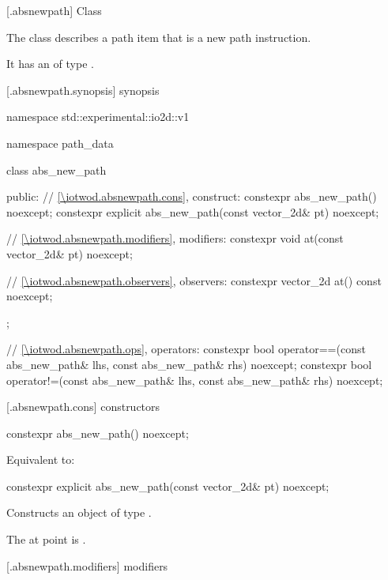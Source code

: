  [\iotwod.absnewpath] {Class }

\pnum
{}%
The class  describes a path item that is a new path instruction.

\pnum
It has an  of type .

 [\iotwod.absnewpath.synopsis] { synopsis}%

\begin{codeblock}
namespace std::experimental::io2d::v1 {
  namespace path_data {
    class abs_new_path {
    public:
      // \ref{\iotwod.absnewpath.cons}, construct:
      constexpr abs_new_path() noexcept;
      constexpr explicit abs_new_path(const vector_2d& pt) noexcept;

      // \ref{\iotwod.absnewpath.modifiers}, modifiers:
      constexpr void at(const vector_2d& pt) noexcept;

      // \ref{\iotwod.absnewpath.observers}, observers:
      constexpr vector_2d at() const noexcept;
    };
    
    // \ref{\iotwod.absnewpath.ops}, operators:
    constexpr bool operator==(const abs_new_path& lhs, const abs_new_path& rhs) 
      noexcept;
    constexpr bool operator!=(const abs_new_path& lhs, const abs_new_path& rhs) 
      noexcept;
  }
}
\end{codeblock}

 [\iotwod.absnewpath.cons] { constructors}%

%
\begin{itemdecl}
constexpr abs_new_path() noexcept;
\end{itemdecl}
\begin{itemdescr}
\pnum
\effects
Equivalent to: 
\end{itemdescr}

%
\begin{itemdecl}
constexpr explicit abs_new_path(const vector_2d& pt) noexcept;
\end{itemdecl}
\begin{itemdescr}
\pnum
\effects
Constructs an object of type .

\pnum
The at point is .
\end{itemdescr}

 [\iotwod.absnewpath.modifiers]{ modifiers}%

